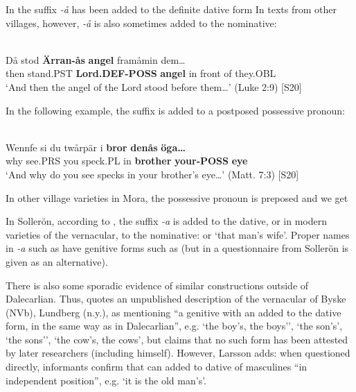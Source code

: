 In  the suffix\textit{ {}-å} has been added to the definite dative form In texts from other villages, however,\textit{ {}-å} is also sometimes added to the nominative:

\ea\label{}
\\
\gll Då  stod  \textbf{Ärran-ås} \textbf{angel} framåmin  dem…\\
then  stand.PST  \textbf{Lord.DEF-POSS} \textbf{angel} in front of  they.OBL\\
\glt ‘And then the angel of the Lord stood before them…’ (Luke 2:9) [S20]
\z

In the following example, the suffix is added to a postposed possessive pronoun:

\ea\label{}
\\
\gll Wennfe  si  du  twårpär  i  \textbf{bror} \textbf{denås} \textbf{öga…}\\
why  see.PRS  you  speck.PL  in  \textbf{brother} \textbf{your-POSS} \textbf{eye}\\
\glt ‘And why do you see specks in your brother’s eye…’ (Matt. 7:3) [S20]
\z

In other village varieties in Mora, the possessive pronoun is preposed and we get 

In Sollerön, according to \citet[357]{AnderssonEtAl1999}, the suffix\textit{ {}-a} is added to the dative, or in modern varieties of the vernacular, to the nominative:  or  ‘that man’s wife’. Proper names in\textit{ {}-a} such as  have genitive forms such as (but in a questionnaire from Sollerön  is given as an alternative).

There is also some sporadic evidence of similar constructions outside of Dalecarlian. Thus, \citet[124]{Larsson1929} quotes an unpublished description of the vernacular of Byske (NVb), Lundberg (n.y.), as mentioning “a genitive with an  added to the dative form, in the same way as in Dalecarlian”, e.g.  ‘the boy’s, the boys’’,  ‘the son’s’,  ‘the sons’’,  ‘the cow’s, the cows’, but claims that no such form has been attested by later researchers (including himself). However, Larsson adds: when questioned directly, informants confirm that  can added to dative of masculines “in independent position”, e.g.  ‘it is the old man’s’. 

